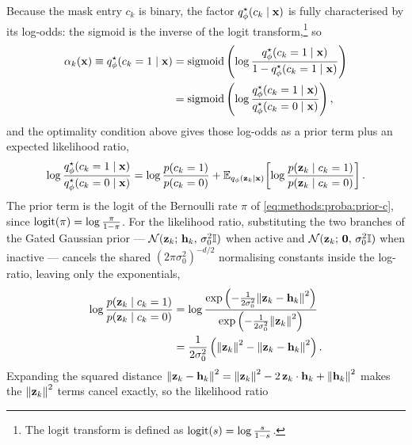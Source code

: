 Because the mask entry $c_k$ is binary, the factor $q_\phi^{\star}(c_k \mid
\vb{x})$ is fully characterised by its log-odds: the sigmoid is the inverse of
the logit transform,\footnote{The logit transform is defined as $\on{logit}(s) =
    \log \frac{s}{1 - s}$.} so
\begin{equation*}
    \begin{split}
        \alpha_{k}(\vb{x}) \equiv q_\phi^{\star}(c_k = 1 \mid \vb{x})
        &= \on{sigmoid} \left(\log \frac{q_\phi^{\star}(c_k = 1 \mid \vb{x})}{1 - q_\phi^{\star}(c_k = 1 \mid \vb{x})}\right) \\
        &= \on{sigmoid} \left(\log \frac{q_\phi^{\star}(c_k = 1 \mid \vb{x})}{q_\phi^{\star}(c_k = 0 \mid \vb{x})}\right),
    \end{split}
\end{equation*}
and the optimality condition above gives those log-odds as a prior term plus an
expected likelihood ratio,
\begin{equation*}
    \log \frac{q_\phi^{\star}(c_k = 1 \mid \vb{x})}{q_\phi^{\star}(c_k = 0 \mid \vb{x})} =
    \log \frac{p(c_k = 1)}{p(c_k = 0)} +
    \E[q_\phi(\vb{z}_k \mid \vb{x})]{\log \frac{p(\vb{z}_k \mid c_k = 1)}{p(\vb{z}_k \mid c_k = 0)}}.
\end{equation*}
The prior term is the logit of the Bernoulli rate $\pi$ of
\cref{eq:methods:proba:prior-c}, since
$\on{logit}(\pi) = \log \frac{\pi}{1-\pi}$. For the likelihood ratio,
substituting the two branches of the Gated Gaussian prior ---
$\mathcal{N}(\vb{z}_k;\, \vb{h}_k,\, \sigma_0^2 \mathbb{I})$ when active and
$\mathcal{N}(\vb{z}_k;\, \vb{0},\, \sigma_0^2 \mathbb{I})$ when inactive ---
cancels the shared $(2\pi\sigma_0^2)^{-d/2}$ normalising constants inside the
log-ratio, leaving only the exponentials,
\begin{equation*}
    \begin{split}
        \log \frac{p(\vb{z}_k \mid c_k = 1)}{p(\vb{z}_k \mid c_k = 0)}
        &= \log \frac{\exp\left(-\frac{1}{2\sigma_0^2}\norm{\vb{z}_k - \vb{h}_k}^2\right)}{\exp\left(-\frac{1}{2\sigma_0^2}\norm{\vb{z}_k}^2\right)} \\
        &= \frac{1}{2\sigma_0^2}\left(\norm{\vb{z}_k}^2 - \norm{\vb{z}_k - \vb{h}_k}^2\right).
    \end{split}
\end{equation*}
Expanding the squared distance
$\norm{\vb{z}_k - \vb{h}_k}^2 = \norm{\vb{z}_k}^2 - 2\,\vb{z}_k \cdot \vb{h}_k + \norm{\vb{h}_k}^2$
makes the $\norm{\vb{z}_k}^2$ terms cancel exactly, so the likelihood ratio
